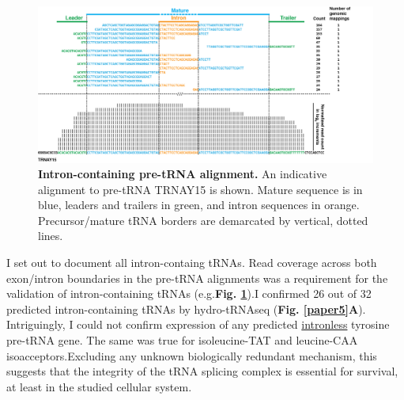 \documentclass[12pt]{rockefeller}
\begin{document}
\begin{figure}[!ht]%
\centering
\includegraphics[width=\textwidth]{intron_trna.png}%
\caption[Intron-containing pre-tRNA alignment.]
{\textbf{Intron-containing pre-tRNA alignment.} An indicative alignment to pre-tRNA TRNAY15 is shown. Mature sequence is in blue, leaders and trailers in green, and intron sequences in orange. Precursor/mature tRNA borders are demarcated by vertical, dotted lines.}
\centering
\label{intron_trna}%
\end{figure}

I set out to document all intron-containg tRNAs. Read coverage across both exon/intron boundaries in the pre-tRNA alignments was a requirement for the validation of intron-containing tRNAs (e.g.\textbf{Fig. \ref{intron_trna}}).I confirmed 26 out of 32 predicted intron-containing tRNAs by hydro-tRNAseq (\textbf{Fig. \ref{paper5}A}).  Intriguingly, I could not confirm expression of any predicted \underline{intronless} tyrosine pre-tRNA gene. The same was true for isoleucine-TAT and leucine-CAA isoacceptors.Excluding any unknown biologically redundant mechanism, this suggests that the integrity of the tRNA splicing complex is essential for survival, at least in the studied cellular system. 
\end{document}
